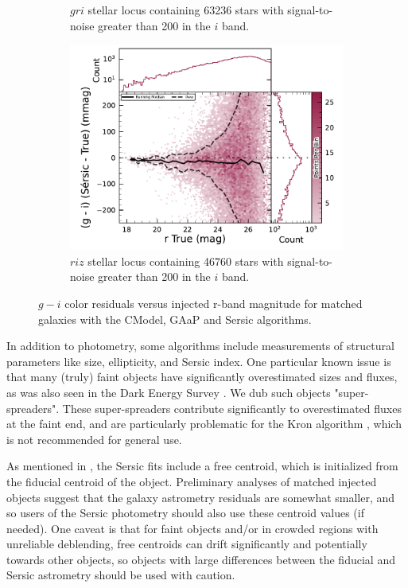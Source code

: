\begin{figure}[hbt!]
\begin{subfigure}[t]{0.31\textwidth}
  \caption{$gri$ stellar locus containing 63236 stars with signal-to-noise greater than 200 in the $i$ band.}
  \end{subfigure}\hfill
    \begin{subfigure}[t]{0.31\textwidth}
\includegraphics[width=\linewidth]{injected_lsst_cells_v1_5063_r_color_sersic_g_minus_i.pdf}
  \caption{$riz$ stellar locus containing 46760 stars with signal-to-noise greater than 200 in the $i$ band.}
  \end{subfigure}\hfill
\caption{$g-i$ color residuals versus injected r-band magnitude for matched galaxies with the CModel, \gls{GAaP} and Sersic algorithms.}
\label{fig:injected_lsst_cells_v1_5063_r_color_g_minus_i}
\vspace{0.1cm}
\end{figure}
In addition to photometry, some algorithms include measurements of structural parameters like size, ellipticity, and Sersic index.
One particular known issue is that many (truly) faint objects have significantly overestimated sizes and fluxes, as was also seen in the Dark Energy Survey \citep{2025arXiv250105739B}.
We dub such objects "super-spreaders".
These super-spreaders contribute significantly to overestimated fluxes at the faint end, and are particularly problematic for the Kron algorithm \citep{1980ApJS...43..305K}, which is not recommended for general use.

As mentioned in , the Sersic fits include a free centroid, which is initialized from the fiducial centroid of the object.
Preliminary analyses of matched injected objects suggest that the galaxy \gls{astrometry} residuals are somewhat smaller, and so users of the Sersic photometry should also use these centroid values (if needed).
One caveat is that for faint objects and/or in crowded regions with unreliable deblending, free centroids can drift significantly and potentially towards other objects, so objects with large differences between the fiducial and Sersic \gls{astrometry} should be used with caution.

